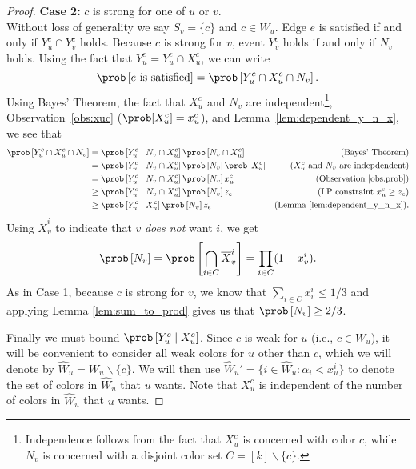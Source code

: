 \begin{proof}
	\bigbreak

	\noindent
	\textbf{Case 2:} $c$ is strong for one of $u$ or $v$. \\
	Without loss of generality we say $S_v = \{c\}$ and $c \in W_u$.
	Edge $e$ is satisfied if and only if $Y_u^c \cap Y_v^c$ holds.
	Because $c$ is strong for $v$, event $Y_v^c$ holds if and only if $N_v$ holds. Using the fact that $Y_u^c = Y_u^c \cap X_u^c$, we can write
	\[
		\prob\left[e \text{ is satisfied}\right] = \prob\left[Y_u^c \cap X_u^c \cap N_v\right].
	\]
	Using Bayes' Theorem, the fact that $X_u^c$ and $N_v$ are independent\footnote{Independence follows from the fact that $X_u^c$ is concerned with color $c$, while $N_v$ is concerned with a disjoint color set $C = [k]\backslash \{c\}$.}, Observation~\ref{obs:xuc} ($\prob[X_u^c] = x_u^c$), and Lemma~\ref{lem:dependent_y_n_x}, we see that
	\begin{align*}
		\prob\left[Y_u^c \cap X_u^c \cap N_v\right] & = \prob\left[ Y_u^c \mid N_v \cap X_u^c \right] \prob\left[ N_v \cap X_u^c \right]                & \text{(Bayes' Theorem)}                     \\
		                                            & = \prob\left[ Y_u^c \mid N_v \cap X_u^c \right] \prob\left[ N_v \right] \prob\left[ X_u^c \right] & \text{($X_u^c$ and $N_v$ are indepdendent)} \\
		                                            & = \prob\left[ Y_u^c \mid N_v \cap X_u^c \right] \prob\left[ N_v \right] x_u^c                     & \text{(Observation~\ref{obs:prob})}         \\
		                                            & \geq \prob\left[ Y_u^c \mid N_v \cap X_u^c \right] \prob\left[ N_v \right] z_e                    & \text{(LP constraint $x_u^c \geq z_e$)}     \\
		                                            & \geq \prob\left[ Y_u^c \mid X_u^c \right] \prob\left[ N_v \right] z_e                             & \text{(Lemma~\ref{lem:dependent_y_n_x}).}
	\end{align*}
	Using $\overline{X}_v^i$ to indicate that $v$ \emph{does not} want $i$, we get
	\[
		\prob\left[ N_v \right] = \prob\left[ \bigcap_{i \in C} \overline{X}_v^i \right] = \prod_{i \in C}(1 - x_v^i).
	\]
	As in Case 1, because $c$ is strong for $v$, we know that $\sum_{i \in C} x_v^i \leq 1/3$ and applying Lemma \ref{lem:sum_to_prod} gives us that $\prob\left[ N_v \right] \geq 2/3$.


	Finally we must bound $\prob\left[ Y_u^c \mid X_u^c \right]$. Since
	$c$ is weak for $u$ (i.e., $c \in W_u$), it will be convenient to consider all weak colors for $u$ other than $c$, which we will denote by $\hat{W}_u = W_u \backslash \{c\}$. We will then use $\hat{W}_u' = \{ i \in \hat{W}_u \colon \alpha_i < x_u^i\}$ to denote the set of colors in $\hat{W}_u$ that $u$ wants. Note that $X_u^c$ is independent of the number of colors in $\hat{W}_u$ that $u$ wants.


\end{proof}
